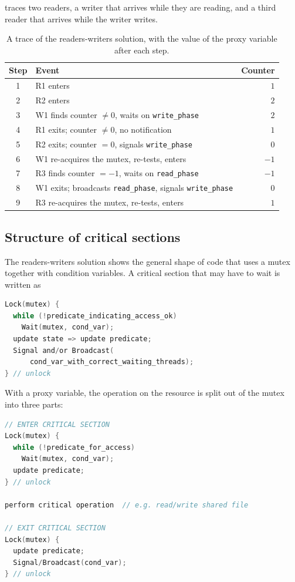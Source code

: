 \documentclass[../main.tex]{subfiles}
\begin{document}
\begin{example}
   traces two readers, a writer that arrives while
  they are reading, and a third reader that arrives while the writer
  writes.
\end{example}

\begin{table}[htbp]
  \centering
  \caption{A trace of the readers-writers solution, with the value of the
    proxy variable after each step.}
  \label{tab:l03-rw-trace}
  \small
  \begin{tabular}{@{}clr@{}}
    \toprule
    Step & Event & Counter \\
    \midrule
    1 & R1 enters                                               & $1$ \\
    2 & R2 enters                                               & $2$ \\
    3 & W1 finds counter $\neq 0$, waits on \texttt{write\_phase} & $2$ \\
    4 & R1 exits; counter $\neq 0$, no notification             & $1$ \\
    5 & R2 exits; counter $=0$, signals \texttt{write\_phase}   & $0$ \\
    6 & W1 re-acquires the mutex, re-tests, enters             & $-1$ \\
    7 & R3 finds counter $=-1$, waits on \texttt{read\_phase}    & $-1$ \\
    8 & W1 exits; broadcasts \texttt{read\_phase}, signals \texttt{write\_phase} & $0$ \\
    9 & R3 re-acquires the mutex, re-tests, enters             & $1$ \\
    \bottomrule
  \end{tabular}
\end{table}

\subsection{Structure of critical sections}

The readers-writers solution shows the general shape of code that uses a
mutex together with condition variables.  A critical section that may have to wait is written as
\begin{lstlisting}[language=C, numbers=none]
Lock(mutex) {
  while (!predicate_indicating_access_ok)
    Wait(mutex, cond_var);
  update state => update predicate;
  Signal and/or Broadcast(
      cond_var_with_correct_waiting_threads);
} // unlock
\end{lstlisting}
With a proxy variable, the operation on the resource is split out of the
mutex into three parts:
\begin{lstlisting}[language=C, numbers=none]
// ENTER CRITICAL SECTION
Lock(mutex) {
  while (!predicate_for_access)
    Wait(mutex, cond_var);
  update predicate;
} // unlock

perform critical operation  // e.g. read/write shared file

// EXIT CRITICAL SECTION
Lock(mutex) {
  update predicate;
  Signal/Broadcast(cond_var);
} // unlock
\end{lstlisting}
\end{document}
